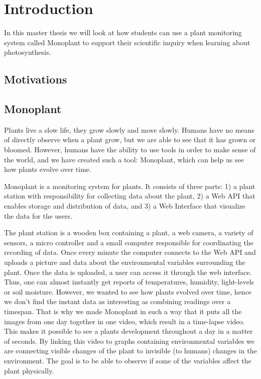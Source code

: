\chapter{Introduction}
In this master thesis we will look at how students can use a plant monitoring system called Monoplant to support their scientific inquiry when learning about photosynthesis.

\section{Motivations}



\section{Monoplant}
Plants live a slow life, they grow slowly and move slowly. Humans have no means of directly observe when a plant grow, but we are able to see that it has grown or bloomed. However, humans have the ability to use tools in order to make sense of the world, and we have created such a tool: Monoplant, which can help us see how plants evolve over time.

Monoplant is a monitoring system for plants. It consists of three parts: 1) a plant station with responsibility for collecting data about the plant, 2) a Web API that enables storage and distribution of data, and 3) a Web Interface that visualize the data for the users. 

The plant station is a wooden box containing a plant, a web camera, a variety of sensors, a micro controller and a small computer responsible for coordinating the recording of data. Once every minute the computer connects to the Web API and uploads a picture and data about the environmental variables surrounding the plant. Once the data is uploaded, a user can access it through the web interface. Thus, one can almost instantly get reports of temperatures, humidity, light-levels or soil moisture. However, we wanted to see how plants evolved over time, hence we don't find the instant data as interesting as combining readings over a timespan. That is why we made Monoplant in such a way that it puts all the images from one day together in one video, which result in a time-lapse video. This makes it possible to see a plants development throughout a day in a matter of seconds. By linking this video to graphs containing environmental variables we are connecting visible changes of the plant to invisible (to humans) changes in the environment. The goal is to be able to observe if some of the variables affect the plant physically. 

